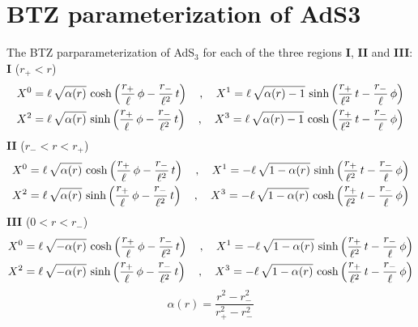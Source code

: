 %
\section{BTZ parameterization of AdS3}
\thispagestyle{empty}

The BTZ parparameterization of AdS$_3$ for each of the three regions \textbf{I}, \textbf{II} and \textbf{III}:\newline
%
\newline
%
%
\textbf{I} \qquad ($r_+ < r$)
%
\begin{align}\label{patch1}
X^0 & = \ell \, \sqrt{\alpha(r)} \, \cosh \left( \frac{r_+}{\ell} \, \phi - \frac{r_-}{\ell^2} \, t \right)
\quad , \quad
X^1 = \ell \, \sqrt{\alpha(r) - 1} \, \sinh \left( \frac{r_+}{\ell^2} \, t - \frac{r_-}{\ell} \, \phi \right)
%
\notag\\
%
X^2 & = \ell \, \sqrt{\alpha(r)} \, \sinh \left( \frac{r_+}{\ell} \, \phi - \frac{r_-}{\ell^2} \, t \right)
\quad , \quad
X^3 = \ell \, \sqrt{\alpha(r) - 1} \, \cosh \left( \frac{r_+}{\ell^2} \, t - \frac{r_-}{\ell} \, \phi \right)
\end{align}
%
%
\textbf{II} \qquad ($r_- < r < r_+$)
%
\begin{align}\label{patch2}
X^0 & = \ell \, \sqrt{\alpha(r)} \, \cosh \left( \frac{r_+}{\ell} \, \phi - \frac{r_-}{\ell^2} \, t \right)
\quad , \quad
X^1 = -\ell \, \sqrt{1 - \alpha(r)} \, \sinh \left( \frac{r_+}{\ell^2} \, t - \frac{r_-}{\ell} \, \phi \right)
%
\notag\\
%
X^2 & = \ell \, \sqrt{\alpha(r)} \, \sinh \left( \frac{r_+}{\ell} \, \phi - \frac{r_-}{\ell^2} \, t \right)
\quad , \quad
X^3 = -\ell \, \sqrt{1 - \alpha(r)} \, \cosh \left( \frac{r_+}{\ell^2} \, t - \frac{r_-}{\ell} \, \phi \right)
\end{align}
%
%
\textbf{III} \qquad ($0 < r < r_-$)
%
\begin{align}\label{patch3}
X^0 & = \ell \, \sqrt{-\alpha(r)} \, \cosh \left( \frac{r_+}{\ell} \, \phi - \frac{r_-}{\ell^2} \, t \right)
\quad , \quad
X^1 = -\ell \, \sqrt{1 - \alpha(r)} \, \sinh \left( \frac{r_+}{\ell^2} \, t - \frac{r_-}{\ell} \, \phi \right)
%
\notag\\
%
X^2 & = \ell \, \sqrt{-\alpha(r)} \, \sinh \left( \frac{r_+}{\ell} \, \phi - \frac{r_-}{\ell^2} \, t \right)
\quad , \quad
X^3 = -\ell \, \sqrt{1 - \alpha(r)} \, \cosh \left( \frac{r_+}{\ell^2} \, t - \frac{r_-}{\ell} \, \phi \right)
\end{align}
%
\begin{equation*}
\alpha(r) = \frac{r^2 - r_-^2}{r_+^2 - r_-^2}
\end{equation*}
%
%